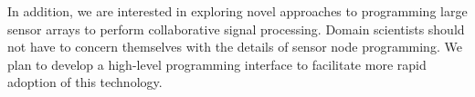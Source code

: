 In addition, we are interested
in exploring novel approaches to programming large sensor arrays to
perform collaborative signal processing. Domain scientists should
not have to concern themselves with the details of sensor node 
programming. We plan to develop a high-level programming interface 
to facilitate more rapid adoption of this technology. 

%

